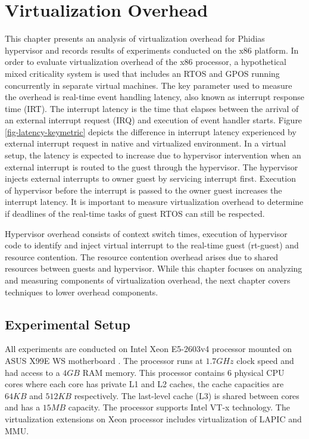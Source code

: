 \chapter{Virtualization Overhead\label{chap3}}

This chapter presents an analysis of virtualization overhead for Phidias hypervisor and records 
results of experiments conducted on the x86 platform. 
In order to evaluate virtualization overhead of the x86 processor, a hypothetical mixed criticality system is used
that includes an RTOS and GPOS running concurrently in separate virtual machines.
The key parameter used to measure the overhead is real-time event handling latency, also known as 
interrupt response time (IRT).
The interrupt latency is the time that elapses between the arrival of an external interrupt request (IRQ) and execution of event handler starts.
Figure \ref{fig-latency-keymetric} depicts the difference in interrupt latency experienced by external interrupt request in native and virtualized environment.
In a virtual setup, the latency is expected to increase due to hypervisor intervention when an external interrupt is routed to the guest through the hypervisor.
The hypervisor injects external interrupts to owner guest by servicing interrupt first. Execution of hypervisor before the interrupt is passed to 
the owner guest increases the interrupt latency.
It is important to measure virtualization overhead to determine if deadlines of the real-time tasks of guest RTOS can still be respected.


Hypervisor overhead consists of context switch times, execution of hypervisor code to identify and inject virtual interrupt to the real-time guest (rt-guest) and
resource contention. The resource contention overhead arises due to shared resources between guests and hypervisor.
While this chapter focuses on analyzing and measuring components of virtualization overhead, the next chapter covers techniques to lower overhead components.

\section{Experimental Setup}
All experiments are conducted on Intel Xeon E5-2603v4 processor \cite{intel-ark-xeon} mounted on ASUS X99E WS motherboard \cite{asus-x99e}. 
The processor runs at $1.7GHz$ clock speed and had access to a $4GB$ RAM memory.
This processor contains $6$ physical CPU cores where each core has private L1 and L2 caches, the cache capacities are $64KB$ and $512KB$ respectively.
The last-level cache (L3) is shared between cores and has a $15MB$ capacity. 
The processor supports Intel VT-x technology. The virtualization extensions on Xeon processor includes virtualization of LAPIC and MMU.

